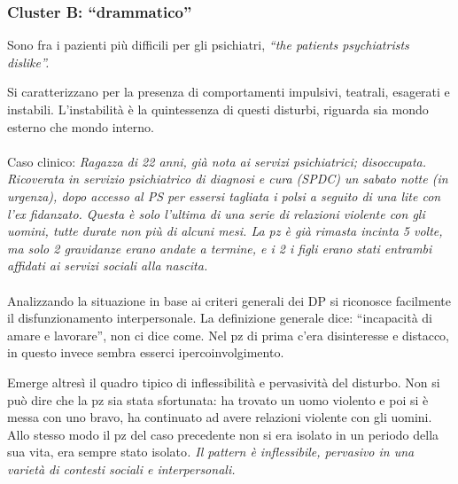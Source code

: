 \subsubsection{Cluster B: ``drammatico''}

Sono fra i pazienti più difficili per gli psichiatri, \emph{``the
patients psychiatrists dislike''.}

Si caratterizzano per la presenza di comportamenti impulsivi, teatrali,
esagerati e instabili. L'instabilità è la quintessenza di questi
disturbi, riguarda sia mondo esterno che mondo interno.
\\\\
Caso clinico: \emph{Ragazza di 22 anni, già nota ai servizi
psichiatrici; disoccupata. Ricoverata in servizio psichiatrico di
diagnosi e cura (SPDC) un sabato notte (in urgenza), dopo accesso al PS
per essersi tagliata i polsi a seguito di una lite con l'ex fidanzato.
Questa è solo l'ultima di una serie di relazioni violente con gli
uomini, tutte durate non più di alcuni mesi. La pz è già rimasta incinta
5 volte, ma solo 2 gravidanze erano andate a termine, e i 2 i figli
erano stati entrambi affidati ai servizi sociali alla nascita.}
\\\\
Analizzando la situazione in base ai criteri generali dei DP si
riconosce facilmente il disfunzionamento interpersonale. La definizione
generale dice: ``incapacità di amare e lavorare'', non ci dice come. Nel
pz di prima c'era disinteresse e distacco, in questo invece sembra
esserci ipercoinvolgimento.

Emerge altresì il quadro tipico di inflessibilità e pervasività del
disturbo. Non si può dire che la pz sia stata sfortunata: ha trovato un
uomo violento e poi si è messa con uno bravo, ha continuato ad avere
relazioni violente con gli uomini. Allo stesso modo il pz del caso
precedente non si era isolato in un periodo della sua vita, era sempre
stato isolato\emph{. Il pattern è inflessibile, pervasivo in una varietà
di contesti sociali e interpersonali.}


